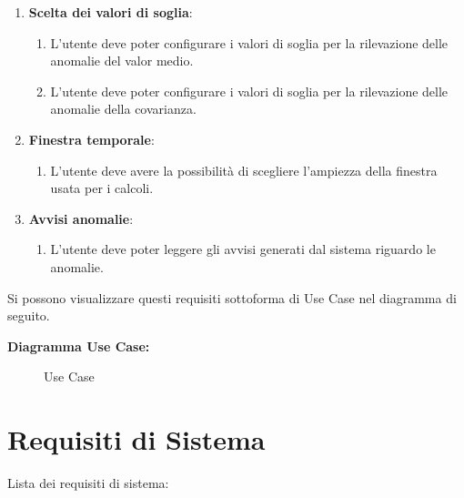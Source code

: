 \documentclass{article}
\begin{document}
\begin{enumerate}
	\item \textbf{Scelta dei valori di soglia}:
	      \begin{enumerate}[label*=\arabic*.]
	      	\item L'utente deve poter configurare i valori di soglia per la rilevazione delle anomalie del valor medio.
	      	              
	      	\item L'utente deve poter configurare i valori di soglia per la rilevazione delle anomalie della covarianza.
	      \end{enumerate}
	          
	\item \textbf{Finestra temporale}: 
	      \begin{enumerate}[label*=\arabic*.]
	      	\item L'utente deve avere la possibilità di scegliere l'ampiezza della finestra usata per i calcoli.
	      \end{enumerate} 
	      
	\item \textbf{Avvisi anomalie}: 
	      \begin{enumerate}[label*=\arabic*.]
	      	\item L'utente deve poter leggere gli avvisi generati dal sistema riguardo le anomalie.    
	      \end{enumerate}
	          
\end{enumerate}

Si possono visualizzare questi requisiti sottoforma di Use Case nel diagramma di seguito.

\newpage

\textbf{Diagramma Use Case:}
\vspace{10pt}

\begin{figure}[ht]
	\centering
	
	\caption{Use Case}
	\label{fig:use_case.svg}
\end{figure}

\clearpage

\section{Requisiti di Sistema}

Lista dei requisiti di sistema:
\vspace{4pt}
\end{document}
